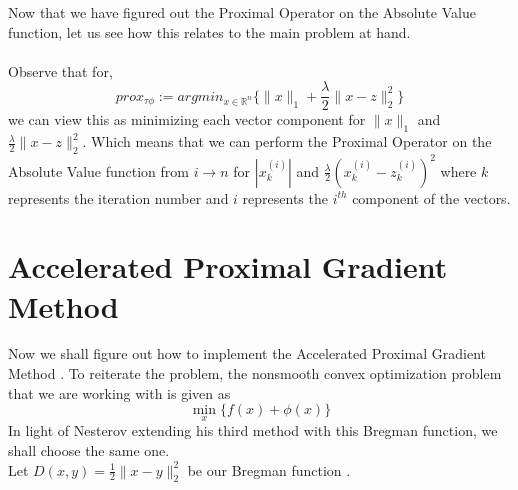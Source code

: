 \documentclass{article}
\renewcommand{\reals}{\mathbb{R}}
\begin{document}
Now that we have figured out the Proximal Operator on the Absolute Value function, let us see how this relates to the main problem at hand. \\
\ \\
Observe that for, 
$$
prox_{\tau \phi} := argmin_{x \in \reals^{n}} \{ \|x\|_{1} + \frac{\lambda}{2}\| x -z \|^{2}_{2} \}
$$
we can view this as minimizing each vector component for $\|x\|_{1}$ and $\frac{\lambda}{2}\|x-z\|_{2}^{2}$. Which means that we can perform the Proximal Operator on the Absolute Value function from $i \rightarrow n$ for $|x_{k}^{(i)}|$ and $\frac{\lambda}{2}(x_{k}^{(i)} - z_{k}^{(i)})^{2}$ where $k$ represents the iteration number and $i$ represents the $i^{th}$ component of  the vectors. 





\section{Accelerated Proximal Gradient Method}
Now we shall figure out how to implement the Accelerated Proximal Gradient Method \cite{tseng2008accelerated}. To reiterate the problem, the nonsmooth convex optimization problem that we are working with is given as
$$
\min_{x} \{ f(x) + \phi(x) \}
$$
In light of Nesterov extending his third method with this Bregman function, we shall choose the same one.\\
Let $D(x,y) = \frac{1}{2}\| x-y \|^{2}_{2}$ be our Bregman function \cite{nesterov2007dual}.\\
\end{document}
